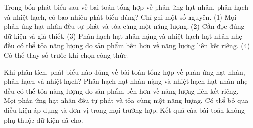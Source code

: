 \begin{ex}
Trong bốn phát biểu sau về bài toán tổng hợp về phản ứng hạt nhân, phân hạch và nhiệt hạch, có bao nhiêu phát biểu đúng? Chỉ ghi một số nguyên. (1) Mọi phản ứng hạt nhân đều tự phát và tỏa cùng một năng lượng. (2) Cần đọc đúng dữ kiện và giả thiết. (3) Phân hạch hạt nhân nặng và nhiệt hạch hạt nhân nhẹ đều có thể tỏa năng lượng do sản phẩm bền hơn về năng lượng liên kết riêng. (4) Có thể thay số trước khi chọn công thức.
\end{ex}

\begin{ex}
Khi phân tích, phát biểu nào đúng về bài toán tổng hợp về phản ứng hạt nhân, phân hạch và nhiệt hạch?
\choice
{\True Phân hạch hạt nhân nặng và nhiệt hạch hạt nhân nhẹ đều có thể tỏa năng lượng do sản phẩm bền hơn về năng lượng liên kết riêng.}
{Mọi phản ứng hạt nhân đều tự phát và tỏa cùng một năng lượng.}
{Có thể bỏ qua điều kiện áp dụng và đơn vị trong mọi trường hợp.}
{Kết quả của bài toán không phụ thuộc dữ kiện đã cho.}
\end{ex}

